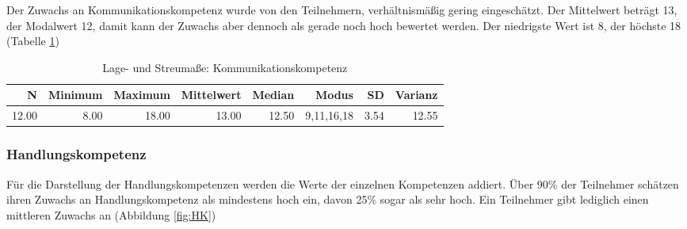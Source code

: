 \documentclass[12pt, bibliography=totoc]{scrartcl}
\begin{document}
Der Zuwachs an Kommunikationskompetenz wurde von den Teilnehmern,
verhältnismäßig gering eingeschätzt. Der Mittelwert beträgt 13, der
Modalwert 12, damit kann der Zuwachs aber dennoch als gerade noch hoch
bewertet werden. Der niedrigste Wert ist 8, der höchste 18 (Tabelle
\ref{tab:lKK})

\begin{table}[H]
\centering
\caption{Lage- und Streumaße: Kommunikationskompetenz}
\label{tab:lKK}
\begin{tabular}{rrrrrrrr}
  \hline
  N & Minimum & Maximum & Mittelwert & Median & Modus & SD & Varianz \\
  \hline
 12.00 & 8.00 & 18.00 & 13.00 & 12.50 & 9,11,16,18 & 3.54 & 12.55 \\

\end{tabular}
\end{table}

\subsubsection{Handlungskompetenz}\label{handlungskompetenz-1}

Für die Darstellung der Handlungskompetenzen werden die Werte der
einzelnen Kompetenzen addiert. Über 90\% der Teilnehmer schätzen ihren
Zuwachs an Handlungskompetenz als mindestens hoch ein, davon 25\% sogar
als sehr hoch. Ein Teilnehmer gibt lediglich einen mittleren Zuwachs an
(Abbildung \ref{fig:HK})
\end{document}

